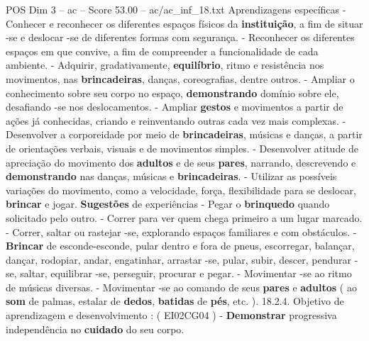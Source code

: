 \begin{textsample}{POS Dim 3 – ac – Score 53.00 – ac/ac\_inf\_18.txt}
Aprendizagens específicas - Conhecer e reconhecer os diferentes espaços físicos da \textbf{instituição}, a fim de situar -se e deslocar -se de diferentes formas com segurança. - Reconhecer os diferentes espaços em que convive, a fim de compreender a funcionalidade de cada ambiente. - Adquirir, gradativamente, \textbf{equilíbrio}, ritmo e resistência nos movimentos, nas \textbf{brincadeiras}, danças, coreografias, dentre outros. - Ampliar o conhecimento sobre seu corpo no espaço, \textbf{demonstrando} domínio sobre ele, desafiando -se nos deslocamentos. - Ampliar \textbf{gestos} e movimentos a partir de ações já conhecidas, criando e reinventando outras cada vez mais complexas. - Desenvolver a corporeidade por meio de \textbf{brincadeiras}, músicas e danças, a partir de orientações verbais, visuais e de movimentos simples. - Desenvolver atitude de apreciação do movimento dos \textbf{adultos} e de seus \textbf{pares}, narrando, descrevendo e \textbf{demonstrando} nas danças, músicas e \textbf{brincadeiras}. - Utilizar as possíveis variações do movimento, como a velocidade, força, flexibilidade para se deslocar, \textbf{brincar} e jogar. \textbf{Sugestões} de experiências - Pegar o \textbf{brinquedo} quando solicitado pelo outro. - Correr para ver quem chega primeiro a um lugar marcado. - Correr, saltar ou rastejar -se, explorando espaços familiares e com obstáculos. - \textbf{Brincar} de esconde-esconde, pular dentro e fora de pneus, escorregar, balançar, dançar, rodopiar, andar, engatinhar, arrastar -se, pular, subir, descer, pendurar -se, saltar, equilibrar -se, perseguir, procurar e pegar. - Movimentar -se ao ritmo de músicas diversas. - Movimentar -se ao comando de seus \textbf{pares} e \textbf{adultos} ( ao \textbf{som} de palmas, estalar de \textbf{dedos}, \textbf{batidas} de \textbf{pés}, etc. ). 18.2.4.
Objetivo de aprendizagem e desenvolvimento : ( EI02CG04 ) - \textbf{Demonstrar} progressiva independência no \textbf{cuidado} do seu corpo.

\end{textsample}
